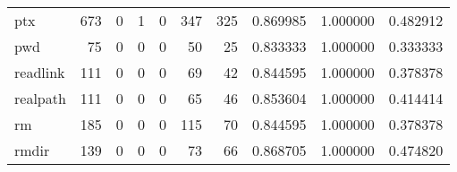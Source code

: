 \begin{longtable}{lrrrrrrrrr}
ptx       &                                   673 &                                                  0 &                                                  1 &                                                  0 &                                                347 &                                                325 &                                           0.869985 &                               1.000000 &                             0.482912 \\
pwd       &                                    75 &                                                  0 &                                                  0 &                                                  0 &                                                 50 &                                                 25 &                                           0.833333 &                               1.000000 &                             0.333333 \\
readlink  &                                   111 &                                                  0 &                                                  0 &                                                  0 &                                                 69 &                                                 42 &                                           0.844595 &                               1.000000 &                             0.378378 \\
realpath  &                                   111 &                                                  0 &                                                  0 &                                                  0 &                                                 65 &                                                 46 &                                           0.853604 &                               1.000000 &                             0.414414 \\
rm        &                                   185 &                                                  0 &                                                  0 &                                                  0 &                                                115 &                                                 70 &                                           0.844595 &                               1.000000 &                             0.378378 \\
rmdir     &                                   139 &                                                  0 &                                                  0 &                                                  0 &                                                 73 &                                                 66 &                                           0.868705 &                               1.000000 &                             0.474820 \\

\end{longtable}
